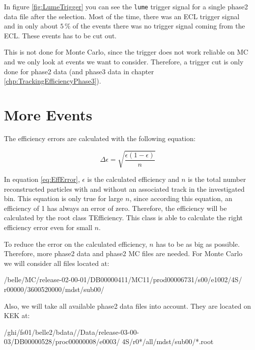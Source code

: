 \documentclass[a4paper,11pt,twosided,final,german,openbib,pdftex,listof=totoc,bibliography=totoc]{scrbook}
\begin{document}
In figure \ref{fig:LumeTrigger} you can see the \texttt{lume} trigger signal for a single phase2 data file after the selection. Most of the time, there was an ECL trigger signal and in only about $5\,\%$ of the events there was no trigger signal coming from the ECL. These events has to be cut out.

This is not done for Monte Carlo, since the trigger does not work reliable on MC and we only look at events we want to consider. Therefore, a trigger cut is only done for phase2 data (and phase3 data in chapter \ref{chp:TrackingEfficiencyPhase3}).

\section{More Events}
\label{sec:Phase2MoreEvents}





The efficiency errors are calculated with the following equation:

\begin{equation}
\Delta \epsilon = \sqrt{\frac{\epsilon(1-\epsilon)}{n}}
\label{eq:EffError}
\end{equation}

In equation \ref{eq:EffError}, $\epsilon$ is the calculated efficiency and $n$ is the total number reconstructed particles with and without an associated track in the investigated bin. This equation is only true for large $n$, since according this equation, an efficiency of 1 has always an error of zero. Therefore, the efficiency will be calculated by the root class TEfficiency. This class is able to calculate the right efficiency error even for small $n$. \cite{TEfficiency}



To reduce the error on the calculated efficiency, $n$ has to be as big as possible. Therefore, more phase2 data and phase2 MC files are needed. For Monte Carlo we will consider all files located at: 
\newline

/belle/MC/release-02-00-01/DB00000411/MC11/prod00006731/s00/e1002/4S/
r00000/3600520000/mdst/sub00/
\newline

Also, we will take all available phase2 data files into account. They are located on KEK at:
\newline

/ghi/fs01/belle2/bdata//Data/release-03-00-03/DB00000528/proc00000008/e0003/ 4S/r0*/all/mdst/sub00/*.root
\newline
\end{document}
